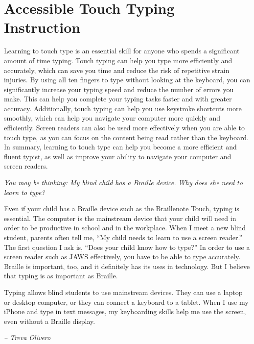 \section{Accessible Touch Typing Instruction}\label{appx5}

Learning to touch type is an essential skill for anyone who spends a significant amount of time typing. Touch typing can help you type more efficiently and accurately, which can save you time and reduce the risk of repetitive strain injuries. By using all ten fingers to type without looking at the keyboard, you can significantly increase your typing speed and reduce the number of errors you make. This can help you complete your typing tasks faster and with greater accuracy. Additionally, touch typing can help you use keystroke shortcuts more smoothly, which can help you navigate your computer more quickly and efficiently. Screen readers can also be used more effectively when you are able to touch type, as you can focus on the content being read rather than the keyboard. In summary, learning to touch type can help you become a more efficient and fluent typist, as well as improve your ability to navigate your computer and screen readers.

\emph{You may be thinking: My blind child has a Braille device. Why does she need to learn to type?}

Even if your child has a Braille device such as the Braillenote Touch, typing is essential. The computer is the mainstream device that your child will need in order to be productive in school and in the workplace. When I meet a new blind student, parents often tell me, ``My child needs to learn to use a screen reader.'' The first question I ask is, ``Does your child know how to type?'' In order to use a screen reader such as JAWS effectively, you have to be able to type accurately. Braille is important, too, and it definitely has its uses in technology. But I believe that typing is as important as Braille.

Typing allows blind students to use mainstream devices. They can use a laptop or desktop computer, or they can connect a keyboard to a tablet. When I use my iPhone and type in text messages, my keyboarding skills help me use the screen, even without a Braille display.

\emph{-- Treva Olivero} \cite{Olivero1997}

